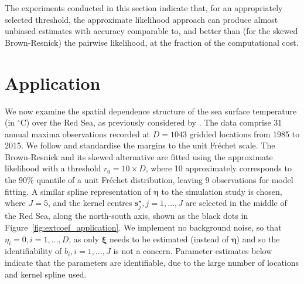 \documentclass[lineno]{biometrika}
\begin{document}
The experiments conducted in this section indicate that, for an appropriately selected threshold, the approximate likelihood approach can produce almost unbiased estimates with accuracy comparable to, and better than (for the skewed Brown-Resnick) the pairwise likelihood, at the fraction of the computational cost.    



\section{Application}
\label{sec:application}

We now examine the spatial dependence structure of
the sea surface temperature (in $^\circ \textrm{C}$) over the Red Sea, as previously considered by \cite{Huser.Zhong:2023}.
The data comprise 31 annual maxima observations recorded at $D=1043$ gridded locations from 1985 to 2015. 
We follow \cite{Huser.Zhong:2023} and standardise the margins to the unit Fr\'echet scale.
%
The Brown-Resnick and its skewed alternative are fitted using the approximate likelihood with a threshold $r_0=10\times D$, where 10 approximately corresponds to the $90\%$ quantile of a unit Fr\'echet distribution, leaving 9 observations for model fitting.
A similar spline representation of $\bm\eta$ to the simulation study is chosen, where $J=5$, and the kernel centres $\bm s_j^\star, j=1, \ldots, J$ are selected in the middle of the Red Sea, along the north-south axis, shown as the black dots in Figure~\ref{fig:extcoef_application}. We implement no background noise, so that $\eta_i=0, i=1, \ldots, D$, as only $\bm\xi$ needs to be estimated (instead of $\bm\eta$) and so the identifiability of $b_i,i=1,\dots,J$ is not a concern. Parameter estimates below indicate that the parameters are identifiable,
due to the large number of locations and kernel spline used.
\end{document}
